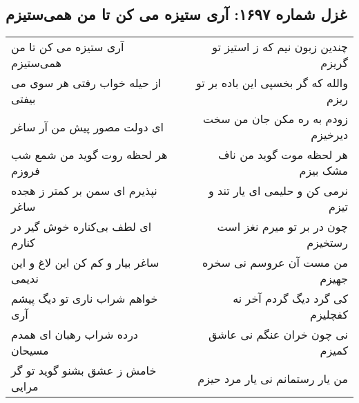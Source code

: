 \begin{center}
\section*{غزل شماره ۱۶۹۷: آری ستیزه می کن تا من همی‌ستیزم}
\label{sec:1697}
\begin{longtable}{l p{0.5cm} r}
آری ستیزه می کن تا من همی‌ستیزم
&&
چندین زبون نیم که ز استیز تو گریزم
\\
از حیله خواب رفتی هر سوی می بیفتی
&&
والله که گر بخسپی این باده بر تو ریزم
\\
ای دولت مصور پیش من آر ساغر
&&
زودم به ره مکن جان من سخت دیرخیزم
\\
هر لحظه روت گوید من شمع شب فروزم
&&
هر لحظه موت گوید من ناف مشک بیزم
\\
نپذیرم ای سمن بر کمتر ز هجده ساغر
&&
نرمی کن و حلیمی ای یار تند و تیزم
\\
ای لطف بی‌کناره خوش گیر در کنارم
&&
چون در بر تو میرم نغز است رستخیزم
\\
ساغر بیار و کم کن این لاغ و این ندیمی
&&
من مست آن عروسم نی سخره جهیزم
\\
خواهم شراب ناری تو دیگ پیشم آری
&&
کی گرد دیگ گردم آخر نه کفچلیزم
\\
درده شراب رهبان ای همدم مسیحان
&&
نی چون خران عنگم نی عاشق کمیزم
\\
خامش ز عشق بشنو گوید تو گر مرایی
&&
من یار رستمانم نی یار مرد حیزم
\\
\end{longtable}
\end{center}
